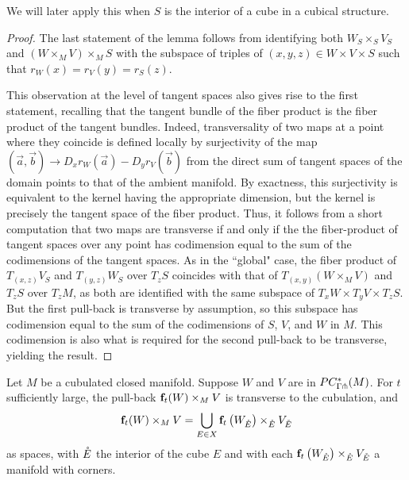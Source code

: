 We will later apply this when $S$ is the interior of a cube in a cubical structure.

\begin{proof}
	The last statement of the lemma follows from identifying both $W_S \times_S V_S$ and $ (W \times_M V) \times_M S$ with
	the subspace of triples of $(x,y,z) \in W \times V \times S$ such that $r_W(x) = r_V(y) = r_S(z)$.

	This observation at the level of tangent spaces	also gives rise to the first statement, recalling that the tangent bundle of the fiber product is the fiber product of the tangent bundles.
	Indeed, transversality of two maps at a point where they coincide is defined locally by surjectivity of the map $(\vec a,\vec b)\to D_xr_W(\vec a)-D_yr_V(\vec b)$ from the direct sum of tangent spaces of the domain points to that of the ambient manifold.
	By exactness, this surjectivity is equivalent to the kernel having the appropriate dimension, but the kernel is precisely the tangent space of the	fiber product.
	Thus, it follows from a short computation that two maps are transverse if and only if the the fiber-product of tangent spaces over any point has codimension equal to the sum of the codimensions of the tangent spaces.
	As in the ``global" case, the fiber product of $T_{(x,z)} V_S$ and $T_{(y,z)} W_S$ over $T_zS$ coincides with that of $T_{(x,y)} (W \times_M V)$ and $T_z S$ over $T_z M$, as both are identified with the same subspace of $T_x W \times T_y V \times T_z S$.
	But the first pull-back is transverse by assumption, so this subspace has codimension equal to the sum of the codimensions of $S$, $V$, and $W$ in $M$.
	This codimension is also what is required for the second pull-back to be transverse, yielding the result.
\end{proof}

\begin{proposition}\label{P:locality}
	Let $M$ be a cubulated closed manifold.
	Suppose $W$ and $V$ are in $PC_{\Gamma \pitchfork}^*(M)$.
	For $t$ sufficiently large, the pull-back $\mathbf{f}_t(W) \times_M V$ is transverse to the cubulation, and
	\begin{equation*}
		\mathbf{f}_t(W) \times_M V = \bigcup_{E \in X} {\mathbf{f}_t\left(W_{\mathring{E}}\right)} \times_{\mathring{E}} V_{\mathring{E}}
	\end{equation*}
	as spaces, with $\mathring{E}$ the interior of the cube $E$ and with each ${\mathbf{f}_t\left(W_{\mathring{E}}\right)} \times_{\mathring{E}} V_{\mathring{E}}$ a manifold with corners.
\end{proposition}

